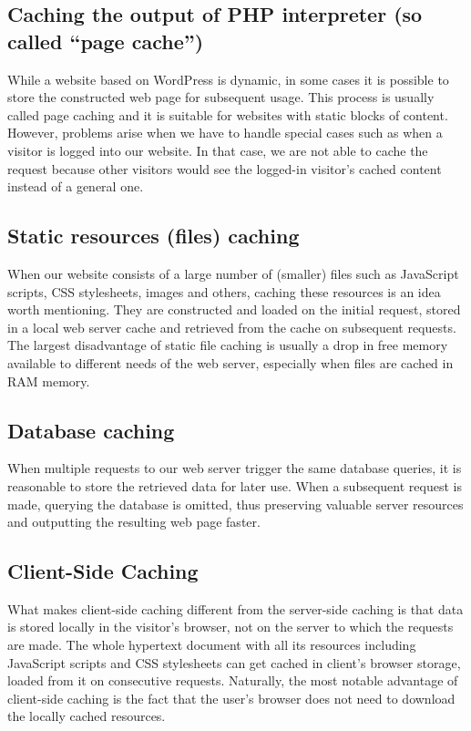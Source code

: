 \subsection*{Caching the output of PHP interpreter (so called “page cache”)}

While a website based on WordPress is dynamic, in some cases it is possible to store the constructed web page for subsequent usage. This process is usually called page caching and it is suitable for websites with static blocks of content. However, problems arise when we have to handle special cases such as when a visitor is logged into our website. In that case, we are not able to cache the request because other visitors would see the logged-in visitor’s cached content instead of a general one.

\subsection*{Static resources (files) caching}

When our website consists of a large number of (smaller) files such as JavaScript scripts, CSS stylesheets, images and others, caching these resources is an idea worth mentioning. They are constructed and loaded on the initial request, stored in a local web server cache and retrieved from the cache on subsequent requests.\\ 

The largest disadvantage of static file caching is usually a drop in free memory available to different needs of the web server, especially when files are cached in RAM memory.

\subsection*{Database caching}

When multiple requests to our web server trigger the same database queries, it is reasonable to store the retrieved data for later use. When a subsequent request is made, querying the database is omitted, thus preserving valuable server resources and outputting the resulting web page faster.

\subsection{Client-Side Caching}

What makes client-side caching different from the server-side caching is that data is stored locally in the visitor’s browser, not on the server to which the requests are made. \cite{Study:Mnot-caching} The whole hypertext document with all its resources including JavaScript scripts and CSS stylesheets can get cached in client's browser storage, loaded from it on consecutive requests. Naturally, the most notable advantage of client-side caching is the fact that the user’s browser does not need to download the locally cached resources. \\

